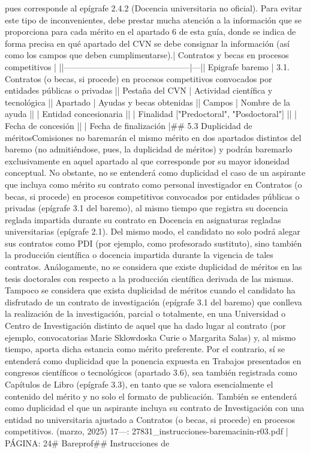 \documentclass{article}
\begin{document}
\begin{itemize}
{{{{{{pues corresponde al epígrafe 2.4.2 (Docencia universitaria no oficial). Para evitar este tipo de inconvenientes, debe prestar mucha atención a la información que se proporciona para cada mérito en el apartado 6 de esta guía, donde se indica de forma precisa en qué apartado del CVN se debe consignar la información (así como los campos que deben cumplimentarse).\n\n| Contratos y becas en procesos competitivos | |\n|---------------------------------------------|---|\n| Epigrafe baremo                             | 3.1. Contratos (o becas, si procede) en procesos competitivos convocados por entidades públicas o privadas |\n| Pestaña del CVN                             | Actividad científica y tecnológica |\n| Apartado                                    | Ayudas y becas obtenidas |\n| Campos                                      | Nombre de la ayuda |\n|                                             | Entidad concesionaria |\n|                                             | Finalidad ["Predoctoral", "Posdoctoral"] |\n|                                             | Fecha de concesión |\n|                                             | Fecha de finalización |\n\n## 5.3 Duplicidad de méritos\n\nLas Comisiones no baremarán el mismo mérito en dos apartados distintos del baremo (no admitiéndose, pues, la duplicidad de méritos) y podrán baremarlo exclusivamente en aquel apartado al que corresponde por su mayor idoneidad conceptual. No obstante, no se entenderá como duplicidad el caso de un aspirante que incluya como mérito su contrato como personal investigador en Contratos (o becas, si procede) en procesos competitivos convocados por entidades públicas o privadas (epígrafe 3.1 del baremo), al mismo tiempo que registra su docencia reglada impartida durante su contrato en Docencia en asignaturas regladas universitarias (epígrafe 2.1). Del mismo modo, el candidato no solo podrá alegar sus contratos como PDI (por ejemplo, como profesorado sustituto), sino también la producción científica o docencia impartida durante la vigencia de tales contratos. Análogamente, no se considera que existe duplicidad de méritos en las tesis doctorales con respecto a la producción científica derivada de las mismas. Tampoco se considera que exista duplicidad de méritos cuando el candidato ha disfrutado de un contrato de investigación (epígrafe 3.1 del baremo) que conlleva la realización de la investigación, parcial o totalmente, en una Universidad o Centro de Investigación distinto de aquel que ha dado lugar al contrato (por ejemplo, convocatorias Marie Sklowdoska Curie o Margarita Salas) y, al mismo tiempo, aporta dicha estancia como mérito preferente. Por el contrario, sí se entenderá como duplicidad que la ponencia expuesta en Trabajos presentados en congresos científicos o tecnológicos (apartado 3.6), sea también registrada como Capítulos de Libro (epígrafe 3.3), en tanto que se valora esencialmente el contenido del mérito y no solo el formato de publicación. También se entenderá como duplicidad el que un aspirante incluya su contrato de Investigación con una entidad no universitaria ajustado a Contratos (o becas, si procede) en procesos competitivos.\n{} (marzo, 2025) 17\n\n---\n\nFUENTE: 27831_instrucciones-baremacinin-r03.pdf | PÁGINA: 24\n# Bareprof\n## Instrucciones de }}}}}}
\end{itemize}
\end{document}

